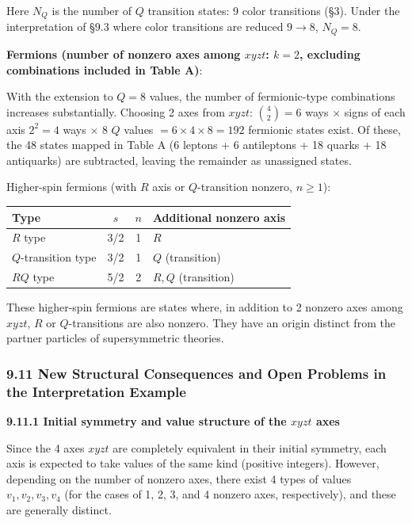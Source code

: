 \documentclass[
  a4paper,11pt]{article}
\newcounter{none}
\theoremstyle{definition}
\theoremstyle{remark}
\begin{document}
Here \(N_Q\) is the number of \(Q\) transition states: 9 color
transitions (§3). Under the interpretation of §9.3 where color
transitions are reduced \(9 \to 8\), \(N_Q = 8\).

\textbf{Fermions (number of nonzero axes among \(xyzt\): \(k = 2\),
excluding combinations included in Table A)}:

With the extension to \(Q = 8\) values, the number of fermionic-type
combinations increases substantially. Choosing 2 axes from \(xyzt\):
\(\binom{4}{2} = 6\) ways \(\times\) signs of each axis \(2^2 = 4\) ways
\(\times\) 8 \(Q\) values \(= 6 \times 4 \times 8 = 192\) fermionic
states exist. Of these, the 48 states mapped in Table A (6 leptons + 6
antileptons + 18 quarks + 18 antiquarks) are subtracted, leaving the
remainder as unassigned states.

Higher-spin fermions (with \(R\) axis or \(Q\)-transition nonzero,
\(n \geq 1\)):

{\def\LTcaptype{none} %
\begin{longtable}[]{@{}lccl@{}}
\toprule\noalign{}
Type & \(s\) & \(n\) & Additional nonzero axis \\
\midrule\noalign{}
\endhead
\bottomrule\noalign{}
\endlastfoot
\(R\) type & 3/2 & 1 & \(R\) \\
\(Q\)-transition type & 3/2 & 1 & \(Q\) (transition) \\
\(RQ\) type & 5/2 & 2 & \(R, Q\) (transition) \\
\end{longtable}
}

These higher-spin fermions are states where, in addition to 2 nonzero
axes among \(xyzt\), \(R\) or \(Q\)-transitions are also nonzero. They
have an origin distinct from the partner particles of supersymmetric
theories.

\subsubsection{9.11 New Structural Consequences and Open Problems in the
Interpretation
Example}\label{new-structural-consequences-and-open-problems-in-the-interpretation-example}

\textbf{9.11.1 Initial symmetry and value structure of the \(xyzt\)
axes}

Since the 4 axes \(xyzt\) are completely equivalent in their initial
symmetry, each axis is expected to take values of the same kind
(positive integers). However, depending on the number of nonzero axes,
there exist 4 types of values \(v_1, v_2, v_3, v_4\) (for the cases of
1, 2, 3, and 4 nonzero axes, respectively), and these are generally
distinct.
\end{document}
